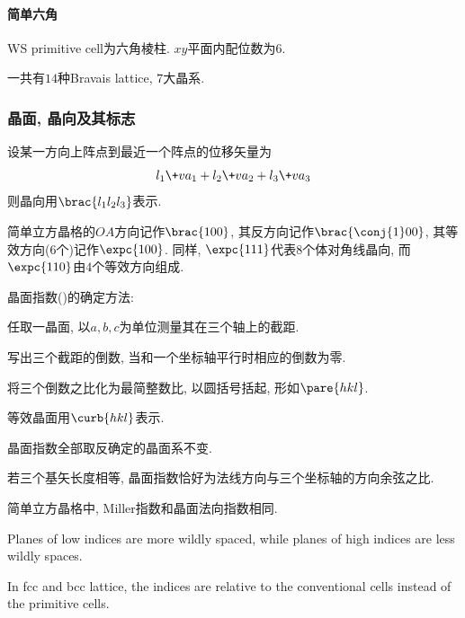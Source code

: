 \documentclass[hidelinks]{ctexart}
\begin{document}

\paragraph{简单六角} %
\label{par:简单六角}

WS primitive cell为六角棱柱. $xy$平面内配位数为$6$.


一共有$14$种Bravais lattice, $7$大晶系.


\subsubsection{晶面, 晶向及其标志} %
\label{ssub:晶面_晶向及其标志}

设某一方向上阵点到最近一个阵点的位移矢量为
\[ l_1 \+va_1 + l_2 \+va_2 + l_3 \+va_3 \]
则晶向用$\brac{l_1l_2l_3}$表示.
\begin{sample}
    \begin{ex}
        简单立方晶格的$OA$方向记作$\brac{100}$, 其反方向记作$\brac{\conj{1}00}$, 其等效方向($6$个)记作$\expc{100}$. 同样, $\expc{111}$代表$8$个体对角线晶向, 而$\expc{110}$由$4$个等效方向组成.
    \end{ex}
\end{sample}
\par
晶面指数()的确定方法:
\begin{cenum}
    \item 任取一晶面, 以$a,b,c$为单位测量其在三个轴上的截距.
    \item 写出三个截距的倒数, 当和一个坐标轴平行时相应的倒数为零.
    \item 将三个倒数之比化为最简整数比, 以圆括号括起, 形如$\pare{hkl}$.
\end{cenum}
等效晶面用$\curb{hkl}$表示.
\begin{remark}
    晶面指数全部取反确定的晶面系不变.
\end{remark}
\begin{remark}
    若三个基矢长度相等, 晶面指数恰好为法线方向与三个坐标轴的方向余弦之比.
\end{remark}
\begin{remark}
    简单立方晶格中, Miller指数和晶面法向指数相同.
\end{remark}
\begin{remark}
    Planes of low indices are more wildly spaced, while planes of high indices are less wildly spaces. 
\end{remark}
In fcc and bcc lattice, the indices are relative to the conventional cells instead of the primitive cells.
\end{document}
